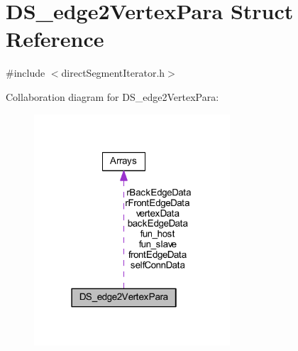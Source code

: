 \hypertarget{structDS__edge2VertexPara}{}\section{D\+S\+\_\+edge2\+Vertex\+Para Struct Reference}
\label{structDS__edge2VertexPara}


{\ttfamily \#include $<$direct\+Segment\+Iterator.\+h$>$}



Collaboration diagram for D\+S\+\_\+edge2\+Vertex\+Para\+:
\nopagebreak
\begin{figure}[H]
\begin{center}
\leavevmode
\includegraphics[width=207pt]{structDS__edge2VertexPara__coll__graph}
\end{center}
\end{figure}
